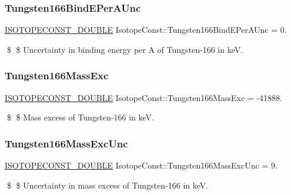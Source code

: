\subsubsection{\texorpdfstring{Tungsten166\+Bind\+E\+Per\+A\+Unc}{Tungsten166BindEPerAUnc}}
{\footnotesize\ttfamily \mbox{\hyperlink{group___isotope_const-_macros_ga8f45a7272ce02c0b4c65c44636ed719a}{I\+S\+O\+T\+O\+P\+E\+C\+O\+N\+S\+T\+\_\+\+D\+O\+U\+B\+LE}} Isotope\+Const\+::\+Tungsten166\+Bind\+E\+Per\+A\+Unc = 0.}

\$ \$ Uncertainty in binding energy per A of Tungsten-\/166 in keV. \mbox{\label{group___isotope_const-_tungsten-_w166_ga36ee172ae0394d49dd352c0422df3ed5}} 
\subsubsection{\texorpdfstring{Tungsten166\+Mass\+Exc}{Tungsten166MassExc}}
{\footnotesize\ttfamily \mbox{\hyperlink{group___isotope_const-_macros_ga8f45a7272ce02c0b4c65c44636ed719a}{I\+S\+O\+T\+O\+P\+E\+C\+O\+N\+S\+T\+\_\+\+D\+O\+U\+B\+LE}} Isotope\+Const\+::\+Tungsten166\+Mass\+Exc = -\/41888.}

\$ \$ Mass excess of Tungsten-\/166 in keV. \mbox{\label{group___isotope_const-_tungsten-_w166_gafba3fa9e9dfa9ad26e519beba127417c}} 
\subsubsection{\texorpdfstring{Tungsten166\+Mass\+Exc\+Unc}{Tungsten166MassExcUnc}}
{\footnotesize\ttfamily \mbox{\hyperlink{group___isotope_const-_macros_ga8f45a7272ce02c0b4c65c44636ed719a}{I\+S\+O\+T\+O\+P\+E\+C\+O\+N\+S\+T\+\_\+\+D\+O\+U\+B\+LE}} Isotope\+Const\+::\+Tungsten166\+Mass\+Exc\+Unc = 9.}

\$ \$ Uncertainty in mass excess of Tungsten-\/166 in keV. \mbox{\label{group___isotope_const-_tungsten-_w166_ga52cbfec9af5995b75fcd2271146b6185}} 
